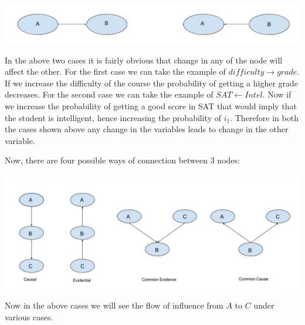 \documentclass{article}
\begin{document}
\includegraphics[width=\linewidth]{imagen2.png}

In the above two cases it is fairly obvious that change in any of the node will affect the other. For the first case we can take the example of $ difficulty \rightarrow grade $. If we increase the difficulty of the course the probability of getting a higher grade decreases. For the second case we can take the example of $ SAT \leftarrow Intel $. Now if we increase the probability of getting a good score in SAT that would imply that the student is intelligent, hence increasing the probability of $ i_1 $. Therefore in both the cases shown above any change in the variables leads to change in the other variable.

Now, there are four possible ways of connection between 3 nodes:

\includegraphics[width=\linewidth]{imagen3.png}

Now in the above cases we will see the flow of influence from $ A $ to $ C $ under various cases.
\end{document}
